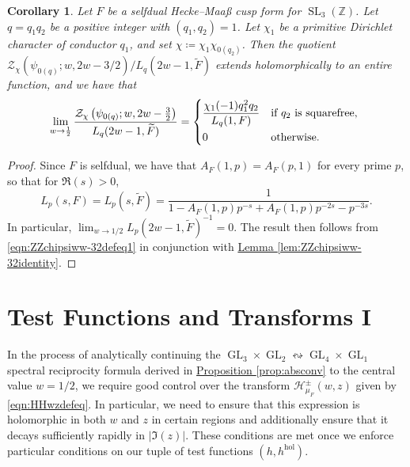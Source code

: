 \documentclass[11pt,a4paper]{amsart}
\newcommand{\HH}{\mathcal{H}}
\newcommand{\hol}{\mathrm{hol}}
\newcommand{\Z}{\mathbb{Z}}
\newcommand{\ZZ}{\mathcal{Z}}
\DeclareMathOperator{\GL}{GL}
\DeclareMathOperator{\SL}{SL}
\numberwithin{equation}{section}
\newtheorem{corollary}[equation]{Corollary}
\theoremstyle{remark}
\theoremstyle{definition}
\begin{document}
\begin{corollary}
\label{cor:ZZchipsi0hol}
Let $F$ be a selfdual Hecke--Maa\ss{} cusp form for $\SL_3(\Z)$. Let $q = q_1 q_2$ be a positive integer with $(q_1,q_2) = 1$. Let $\chi_1$ be a primitive Dirichlet character of conductor $q_1$, and set $\chi \coloneqq \chi_1 \chi_{0(q_2)}$. Then the quotient $\ZZ_{\chi}(\psi_{0(q)};w,2w - 3/2) / L_q(2w - 1,\widetilde{F})$ extends holomorphically to an entire function, and we have that
\[\lim_{w \to \frac{1}{2}} \frac{\ZZ_{\chi}\left(\psi_{0(q)};w,2w - \frac{3}{2}\right)}{L_q(2w - 1,\widetilde{F})} = \begin{dcases*}
\frac{\chi_1(-1) q_1^2 q_2}{L_q(1,F)} & if $q_2$ is squarefree,	\\
0 & otherwise.
\end{dcases*}\]
\end{corollary}

\begin{proof}
Since $F$ is selfdual, we have that $A_F(1,p) = A_F(p,1)$ for every prime $p$, so that for $\Re(s) > 0$,
\[L_p(s,F) = L_p(s,\widetilde{F}) = \frac{1}{1 - A_F(1,p) p^{-s} + A_F(1,p) p^{-2s} - p^{-3s}}.\]
In particular, $\lim_{w \to 1/2} L_p(2w - 1,\widetilde{F})^{-1} = 0$. The result then follows from \eqref{eqn:ZZchipsiww-32defeq1} in conjunction with \hyperref[lem:ZZchipsiww-32identity]{Lemma \ref*{lem:ZZchipsiww-32identity}}.
\end{proof}



\section{Test Functions and Transforms I}
\label{sect:testfunction}

In the process of analytically continuing the $\GL_3 \times \GL_2 \leftrightsquigarrow \GL_4 \times \GL_1$ spectral reciprocity formula derived in \hyperref[prop:absconv]{Proposition \ref*{prop:absconv}} to the central value $w = 1/2$, we require good control over the transform $\HH_{\mu_F}^{\pm}(w,z)$ given by \eqref{eqn:HHwzdefeq}. In particular, we need to ensure that this expression is holomorphic in both $w$ and $z$ in certain regions and additionally ensure that it decays sufficiently rapidly in $|\Im(z)|$. These conditions are met once we enforce particular conditions on our tuple of test functions $(h,h^{\hol})$.
\end{document}
